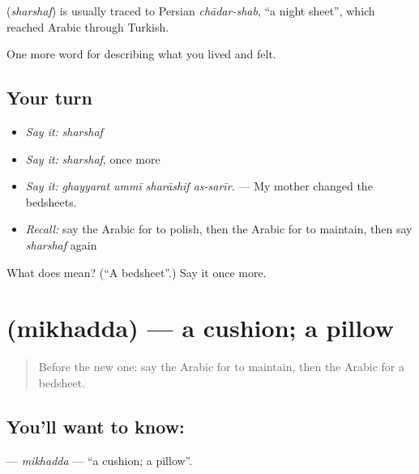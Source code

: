 \begin{cousinweb}
\textbf{} (\emph{sharshaf}) is usually traced to Persian \emph{chādar-shab}, \textquotedblleft{}a night sheet\textquotedblright{}, which reached Arabic through Turkish.
\end{cousinweb}

\begin{grammarlens}[title={What you've built}]
One more word for describing what you lived and felt.
\end{grammarlens}

\subsection*{Your turn}
\begin{itemize}
\raggedright
  \item \emph{Say it:} \emph{sharshaf}
  \item \emph{Say it:} \emph{sharshaf}, once more
  \item \emph{Say it:} \emph{ghayyarat ummī sharāshif as-sarīr.} — My mother changed the bedsheets.
  \item \emph{Recall:} say the Arabic for to polish, then the Arabic for to maintain, then say \emph{sharshaf} again
\end{itemize}

\begin{tcolorbox}[breakable,colback=teal!4,colframe=teal!35!black,title={Before you move on}]
What does  mean? (\textquotedblleft{}A bedsheet\textquotedblright{}.) Say it once more.
\end{tcolorbox}
\section[\texorpdfstring{\ar{مخدة} (mikhadda)}{مخدة (mikhadda)}]{ (mikhadda) — a cushion; a pillow}

\label{lesson:AR-C551-mikhadda}



\begin{quote}
Before the new one: say the Arabic for to maintain, then the Arabic for a bedsheet.
\end{quote}

\subsection*{You'll want to know: }
\textbf{} — \emph{mikhadda} — \textquotedblleft{}a cushion; a pillow\textquotedblright{}.

